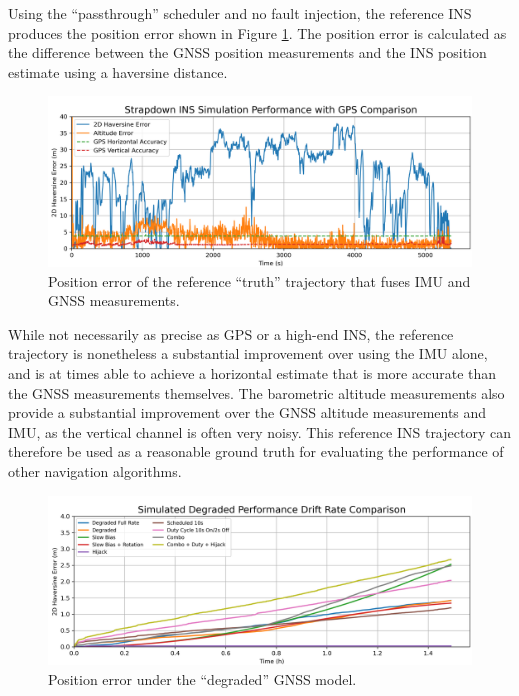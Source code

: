 \documentclass[Afour,sageh,times]{sagej}
\begin{document}
Using the ``passthrough'' scheduler and no fault injection, the reference INS produces the position error shown in Figure \ref{fig:truth_error}. The position error is calculated as the difference between the GNSS position measurements and the INS position estimate using a haversine distance. 

\begin{figure}
  \centering
  \includegraphics[width=\textwidth]{images/performance.png}  
  \caption{Position error of the reference ``truth'' trajectory that fuses IMU and GNSS measurements.}
  \label{fig:truth_error}
\end{figure}

While not necessarily as precise as GPS or a high-end INS, the reference trajectory is nonetheless a substantial improvement over using the IMU alone, and is at times able to achieve a horizontal estimate that is more accurate than the GNSS measurements themselves. The barometric altitude measurements also provide a substantial improvement over the GNSS altitude measurements and IMU, as the vertical channel is often very noisy. This reference INS trajectory can therefore be used as a reasonable ground truth for evaluating the performance of other navigation algorithms.

\begin{figure}
  \centering
  \includegraphics[width=\textwidth]{images/performance_comparison.png}  
  \caption{Position error under the ``degraded'' GNSS model.}
  \label{fig:degraded_performance}
\end{figure}
\end{document}
